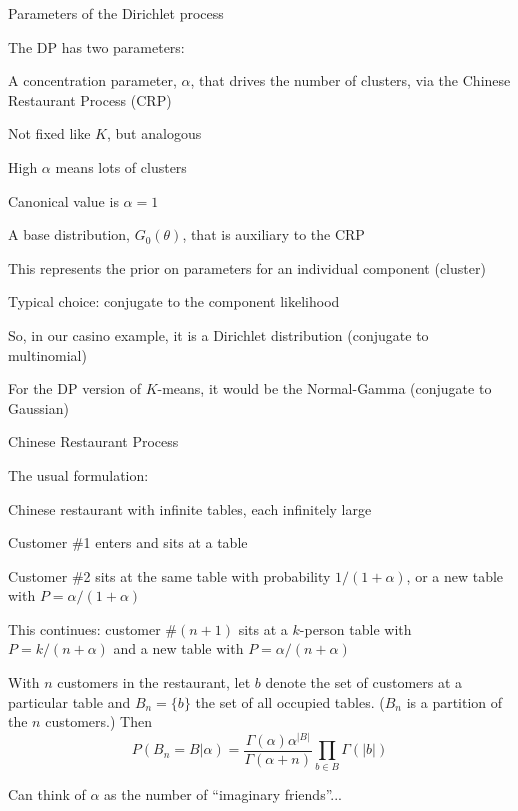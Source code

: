 \documentclass{beamer}
\begin{document}
\begin{frame}{Parameters of the Dirichlet process}

The DP has two parameters:

\itemb
\item A \alert{concentration parameter}, $\alpha$, that drives the number of clusters, via the \alert{Chinese Restaurant Process} (CRP)
 \itemb
 \item Not fixed like $K$, but analogous
 \item High $\alpha$ means lots of clusters
 \item Canonical value is $\alpha=1$
 \iteme
\item A \alert{base distribution}, $G_0(\theta)$, that is auxiliary to the CRP
 \itemb
 \item This represents the prior on parameters for an individual component (cluster)
 \item Typical choice: conjugate to the component likelihood
 \itemb
  \item So, in our casino example, it is a Dirichlet distribution (conjugate to multinomial)
  \item For the DP version of $K$-means, it would be the Normal-Gamma (conjugate to Gaussian)
 \iteme
 \iteme
\iteme

\end{frame}


\begin{frame}{Chinese Restaurant Process}

The usual formulation:
\itemb
\item Chinese restaurant with infinite tables, each infinitely large
\item Customer \#1 enters and sits at a table
\item Customer \#2 sits at the same table with probability $1/(1+\alpha)$, or a new table with $P=\alpha/(1+\alpha)$
\item This continues: customer \#$(n+1)$ sits at a $k$-person table with $P=k/(n+\alpha)$ and a new table with $P=\alpha/(n+\alpha)$
\iteme

With $n$ customers in the restaurant, let $b$ denote the set of customers at a particular table and $B_n = \{ b \}$ the set of all occupied tables.
($B_n$ is a \alert{partition} of the $n$ customers.)
Then
\[
P(B_n = B|\alpha) = \frac{\Gamma(\alpha) \alpha^{|B|}}{\Gamma(\alpha+n)} \prod_{b \in B} \Gamma(|b|)
\]

Can think of $\alpha$ as the number of ``imaginary friends''...

\end{frame}
\end{document}
